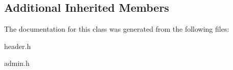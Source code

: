 \subsection*{Additional Inherited Members}


The documentation for this class was generated from the following files\+:\begin{DoxyCompactItemize}
\item 
header.\+h\item 
admin.\+h\end{DoxyCompactItemize}
